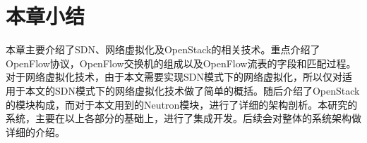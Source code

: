 \section{本章小结}
本章主要介绍了SDN、网络虚拟化及OpenStack的相关技术。重点介绍了OpenFlow协议，OpenFlow交换机的组成以及OpenFlow流表的字段和匹配过程。对于网络虚拟化技术，由于本文需要实现SDN模式下的网络虚拟化，所以仅对适用于本文的SDN模式下的网络虚拟化技术做了简单的概括。随后介绍了OpenStack的模块构成，而对于本文用到的Neutron模块，进行了详细的架构剖析。本研究的系统，主要在以上各部分的基础上，进行了集成开发。后续会对整体的系统架构做详细的介绍。

\ifx\usechapbib\empty
\nocite{BSTcontrol}
\setcounter{NAT@ctr}{0}


\fi
